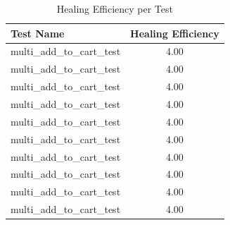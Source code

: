
\begin{table}[h]
\centering
\caption{Healing Efficiency per Test}
\begin{tabular}{l c}
\toprule
Test Name & Healing Efficiency \\
\midrule
multi_add_to_cart_test & 4.00 \\
multi_add_to_cart_test & 4.00 \\
multi_add_to_cart_test & 4.00 \\
multi_add_to_cart_test & 4.00 \\
multi_add_to_cart_test & 4.00 \\
multi_add_to_cart_test & 4.00 \\
multi_add_to_cart_test & 4.00 \\
multi_add_to_cart_test & 4.00 \\
multi_add_to_cart_test & 4.00 \\
multi_add_to_cart_test & 4.00 \\

\bottomrule
\end{tabular}
\end{table}

